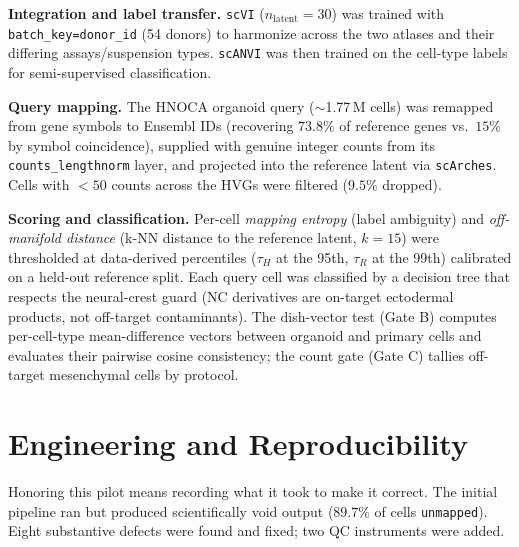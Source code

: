 \documentclass[11pt]{article}
\begin{document}
\textbf{Integration and label transfer.} \texttt{scVI} ($n_{\text{latent}}=30$) was trained with \texttt{batch\_key=donor\_id} (54 donors) to harmonize across the two atlases and their differing assays/suspension types. \texttt{scANVI} was then trained on the cell-type labels for semi-supervised classification.

\textbf{Query mapping.} The HNOCA organoid query ($\sim$1.77\,M cells) was remapped from gene symbols to Ensembl IDs (recovering $73.8\%$ of reference genes vs.\ $15\%$ by symbol coincidence), supplied with genuine integer counts from its \texttt{counts\_lengthnorm} layer, and projected into the reference latent via \texttt{scArches}. Cells with $<50$ counts across the HVGs were filtered ($9.5\%$ dropped).

\textbf{Scoring and classification.} Per-cell \emph{mapping entropy} (label ambiguity) and \emph{off-manifold distance} (k-NN distance to the reference latent, $k=15$) were thresholded at data-derived percentiles ($\tau_H$ at the 95th, $\tau_R$ at the 99th) calibrated on a held-out reference split. Each query cell was classified by a decision tree that respects the neural-crest guard (NC derivatives are on-target ectodermal products, not off-target contaminants). The dish-vector test (Gate B) computes per-cell-type mean-difference vectors between organoid and primary cells and evaluates their pairwise cosine consistency; the count gate (Gate C) tallies off-target mesenchymal cells by protocol.

\section{Engineering and Reproducibility}
Honoring this pilot means recording what it took to make it correct. The initial pipeline ran but produced scientifically void output ($89.7\%$ of cells \texttt{unmapped}). Eight substantive defects were found and fixed; two QC instruments were added.
\end{document}
